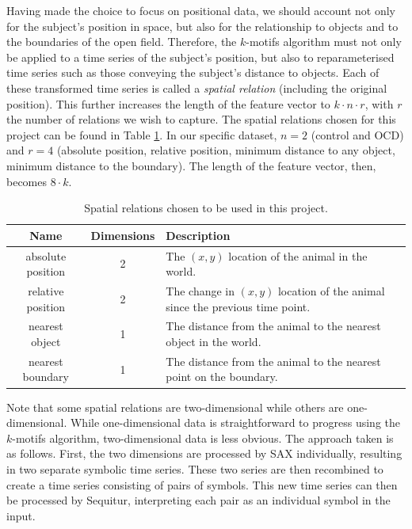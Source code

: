 \documentclass[conference,a4paper,twoside]{IEEEtran}
\begin{document}
Having made the choice to focus on positional data, we should account not only for the subject's position in space, but also for the relationship to objects and to the boundaries of the open field. Therefore, the $k$-motifs algorithm must not only be applied to a time series of the subject's position, but also to reparameterised time series such as those conveying the subject's distance to objects. Each of these transformed time series is called a \emph{spatial relation} (including the original position). This further increases the length of the feature vector to $k \cdot n \cdot r$, with $r$ the number of relations we wish to capture. The spatial relations chosen for this project can be found in Table \ref{tab:spatrel}. In our specific dataset, $n=2$ (control and OCD) and $r=4$ (absolute position, relative position, minimum distance to any object, minimum distance to the boundary). The length of the feature vector, then, becomes $8 \cdot k$.

\begin{table}
    \centering
    \caption{Spatial relations chosen to be used in this project.}
    \begin{tabular}{ccl}
    Name & Dimensions & Description \\\hline
    absolute position & 2 & The $(x,y)$ location of the animal in the world. \\
    relative position & 2 & The change in $(x,y)$ location of the animal since the previous time point. \\
    nearest object & 1 & The distance from the animal to the nearest object in the world. \\
    nearest boundary & 1 & The distance from the animal to the nearest point on the boundary. \\
    \end{tabular}
    \label{tab:spatrel}
\end{table}

Note that some spatial relations are two-dimensional while others are one-dimensional. While one-dimensional data is straightforward to progress using the $k$-motifs algorithm, two-dimensional data is less obvious. The approach taken is as follows. First, the two dimensions are processed by SAX individually, resulting in two separate symbolic time series. These two series are then recombined to create a time series consisting of pairs of symbols. This new time series can then be processed by Sequitur, interpreting each pair as an individual symbol in the input.
\end{document}
